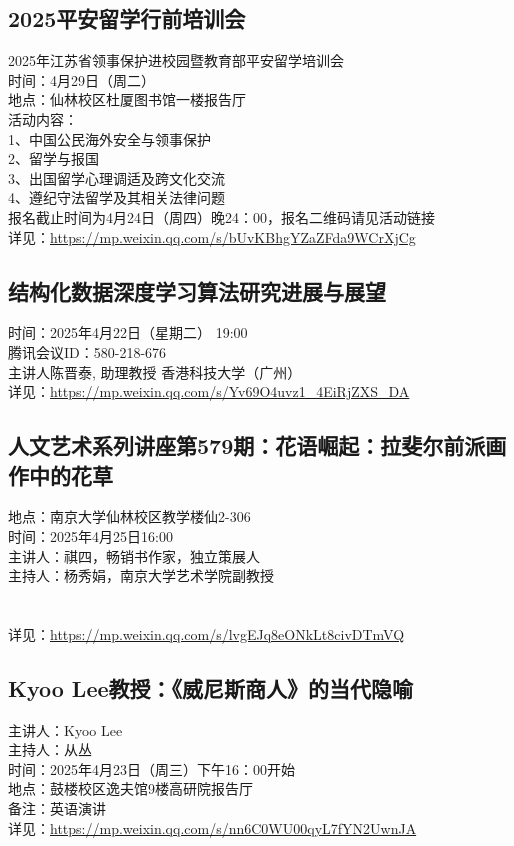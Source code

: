 \documentclass[letterpaper, 12pt]{article}
\begin{document}
\begin{multicols}{2}
\begin{tabular}{|>{\centering\arraybackslash}m{}|m{}|m{}|}
\end{tabular}
\subsection{2025平安留学行前培训会} %
2025年江苏省领事保护进校园暨教育部平安留学培训会
\\时间：4月29日（周二）
\\地点：仙林校区杜厦图书馆一楼报告厅
\\活动内容：
\\1、中国公民海外安全与领事保护
\\2、留学与报国
\\3、出国留学心理调适及跨文化交流
\\4、遵纪守法留学及其相关法律问题
\\报名截止时间为4月24日（周四）晚24：00，报名二维码请见活动链接
\\详见：\url{https://mp.weixin.qq.com/s/bUvKBhgYZaZFda9WCrXjCg}

\subsection{结构化数据深度学习算法研究进展与展望} %
时间：2025年4月22日（星期二） 19:00
\\腾讯会议ID：580-218-676
\\主讲人陈晋泰, 助理教授 香港科技大学（广州）
\\详见：\url{https://mp.weixin.qq.com/s/Yv69O4uvz1_4EiRjZXS_DA}

\subsection{人文艺术系列讲座第579期：花语崛起：拉斐尔前派画作中的花草} %
地点：南京大学仙林校区教学楼仙2-306
\\时间：2025年4月25日16:00
\\主讲人：祺四，畅销书作家，独立策展人
\\主持人：杨秀娟，南京大学艺术学院副教授
\\
\\
\\详见：\url{https://mp.weixin.qq.com/s/lvgEJq8eONkLt8civDTmVQ}

\subsection{Kyoo Lee教授：《威尼斯商人》的当代隐喻} %
主讲人：Kyoo Lee
\\主持人：从丛
\\时间：2025年4月23日（周三）下午16：00开始
\\地点：鼓楼校区逸夫馆9楼高研院报告厅
\\备注：英语演讲
\\详见：\url{https://mp.weixin.qq.com/s/nn6C0WU00qyL7fYN2UwnJA}


\end{multicols}
\end{document}
